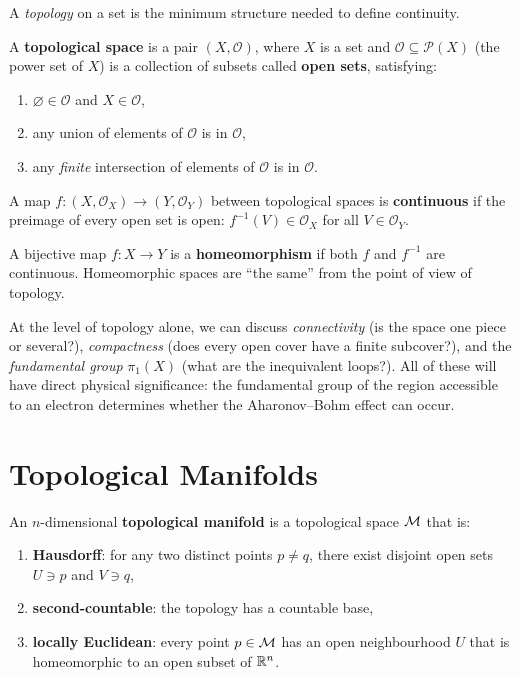 A \emph{topology} on a set is the minimum structure needed to define continuity.

\begin{definition}
A \textbf{topological space} is a pair $(X, \mathcal{O})$, where $X$ is a set and $\mathcal{O} \subseteq \mathcal{P}(X)$ (the power set of $X$) is a collection of subsets called \textbf{open sets}, satisfying:
\begin{enumerate}
\item $\varnothing \in \mathcal{O}$ and $X \in \mathcal{O}$,
\item any union of elements of $\mathcal{O}$ is in $\mathcal{O}$,
\item any \emph{finite} intersection of elements of $\mathcal{O}$ is in $\mathcal{O}$.
\end{enumerate}
\end{definition}

\begin{definition}
A map $f: (X, \mathcal{O}_X) \to (Y, \mathcal{O}_Y)$ between topological spaces is \textbf{continuous} if the preimage of every open set is open: $f^{-1}(V) \in \mathcal{O}_X$ for all $V \in \mathcal{O}_Y$.
\end{definition}

\begin{definition}[Homeomorphism]
A bijective map $f: X \to Y$ is a \textbf{homeomorphism} if both $f$ and $f^{-1}$ are continuous. Homeomorphic spaces are ``the same'' from the point of view of topology.
\end{definition}

\begin{remark}
At the level of topology alone, we can discuss \emph{connectivity} (is the space one piece or several?), \emph{compactness} (does every open cover have a finite subcover?), and the \emph{fundamental group} $\pi_1(X)$ (what are the inequivalent loops?). All of these will have direct physical significance: the fundamental group of the region accessible to an electron determines whether the Aharonov--Bohm effect can occur.
\end{remark}

\section{Topological Manifolds}

\begin{definition}
An $n$-dimensional \textbf{topological manifold} is a topological space $\mathcal{M}$ that is:
\begin{enumerate}
\item \textbf{Hausdorff}: for any two distinct points $p \neq q$, there exist disjoint open sets $U \ni p$ and $V \ni q$,
\item \textbf{second-countable}: the topology has a countable base,
\item \textbf{locally Euclidean}: every point $p \in \mathcal{M}$ has an open neighbourhood $U$ that is homeomorphic to an open subset of $\mathbb{R}^n$.
\end{enumerate}
\end{definition}


